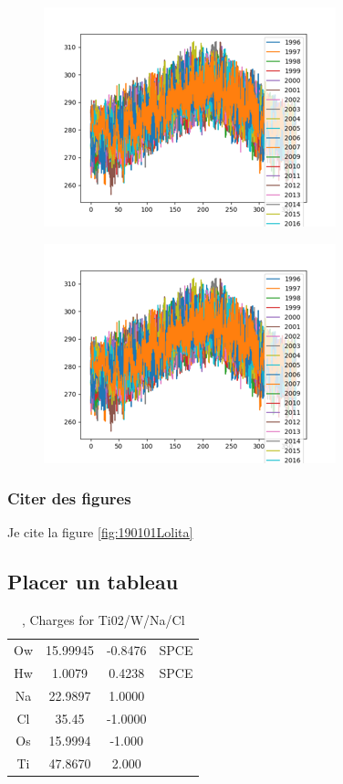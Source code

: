 \documentclass[11pt,a4paper]{article}
\begin{document}
\begin{figure}
  \includegraphics[width=0.48 \textwidth]{./imagesTIPE/temperature.png}\quad
\end{figure}
\begin{figure}
  \includegraphics[width=0.48 \textwidth]{./imagesTIPE/temperature.png}\quad
\end{figure}

\subsubsection{Citer des figures}
Je cite la figure \ref{fig:190101Lolita}
\subsection{Placer un tableau}
\begin{table}[ht]
\begin{tabular}{cccc}\hline
\hline
Ow& 15.99945& -0.8476&SPCE\\
Hw&  1.0079 &  0.4238&SPCE\\
Na& 22.9897 &  1.0000&\\         
Cl& 35.45   & -1.0000&\\
Os& 15.9994 & -1.000 &\\   
Ti& 47.8670 &  2.000 &\\  
\hline 
\end{tabular}                     
\caption{\label{MonTableau}, Charges for Ti02/W/Na/Cl}
\end{table}
\end{document}
